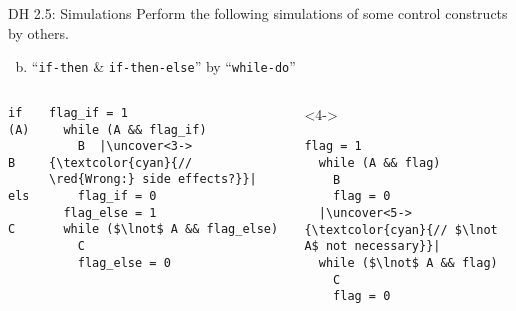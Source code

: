 \begin{frame}[fragile]{}
  \begin{exampleblock}{DH 2.5: Simulations}
    Perform the following simulations of some control constructs by others.
    \begin{enumerate}[(a)]
      \setcounter{enumi}{(1)}
      \item ``\texttt{if-then} \& \texttt{if-then-else}'' by ``\texttt{while-do}''
    \end{enumerate}
  \end{exampleblock}

  \begin{columns}
      \begin{lstlisting}[style = Cstyle, backgroundcolor = \color{teal!10!lightgray}]
  if (A)
    B
  else
    C
      \end{lstlisting}

      \pause
      \begin{lstlisting}[style = Cstyle]
  flag_if = 1
  while (A && flag_if)
    B  |\uncover<3->{\textcolor{cyan}{// \red{Wrong:} side effects?}}|
    flag_if = 0
  flag_else = 1
  while ($\lnot$ A && flag_else)
    C
    flag_else = 0
      \end{lstlisting}

      \begin{onlyenv}<4->
      \begin{lstlisting}[style = Cstyle]
  flag = 1
  while (A && flag)
    B
    flag = 0
  |\uncover<5->{\textcolor{cyan}{// $\lnot A$ not necessary}}|
  while ($\lnot$ A && flag)
    C
    flag = 0
      \end{lstlisting}
      \end{onlyenv}
  \end{columns}
\end{frame}
